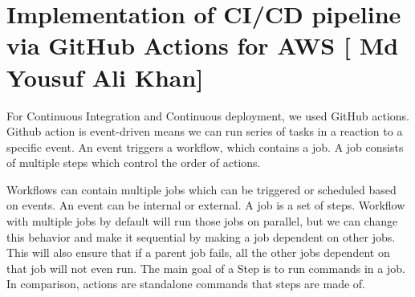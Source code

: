 \newpage
\section{Implementation of CI/CD pipeline via GitHub Actions for AWS [ Md Yousuf Ali Khan]}\label{sec:chapter_1}
For Continuous Integration and Continuous deployment, we used GitHub actions. Github action is event-driven means we can run series of tasks in a reaction to a specific event. An event triggers a workflow, which contains a job. A job consists of multiple steps which control the order of actions.

Workflows can contain multiple jobs which can be triggered or scheduled based on events. An event can be internal or external. A job is a set of steps. Workflow with multiple jobs by default will run those jobs on parallel, but we can change this behavior and make it sequential by making a job dependent on other jobs. This will also ensure that if a parent job fails, all the other jobs dependent on that job will not even run. The main goal of a Step is to run commands in a job. In comparison, actions are standalone commands that steps are made of. 

